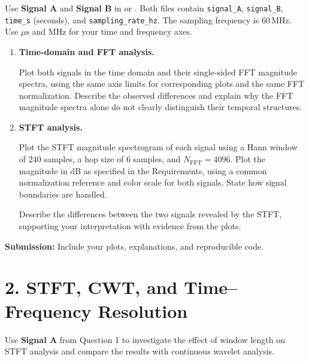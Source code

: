 \documentclass[11pt,a4paper]{article}
\begin{document}
Use \textbf{Signal A} and \textbf{Signal B} in  or
. Both files contain \texttt{signal\_A},
\texttt{signal\_B}, \texttt{time\_s} (seconds), and
\texttt{sampling\_rate\_hz}. The sampling frequency is $60\,\mathrm{MHz}$.
Use $\mu\mathrm{s}$ and $\mathrm{MHz}$ for your time and frequency axes.

\begin{enumerate}[label=(\alph*), leftmargin=1.5em]
    \item \textbf{Time-domain and FFT analysis.}

    Plot both signals in the time domain and their single-sided FFT magnitude
    spectra, using the same axis limits for corresponding plots and the same
    FFT normalization. Describe the observed
    differences and explain why the FFT magnitude spectra alone do not clearly
    distinguish their temporal structures.

    \item \textbf{STFT analysis.}

    Plot the STFT magnitude spectrogram of each signal using a Hann window
    of $240$ samples, a hop size of $6$ samples, and
    $N_{\mathrm{FFT}}=4096$. Plot the magnitude in dB as specified in the
    Requirements, using a common normalization reference and color scale
    for both signals. State how signal boundaries are handled.

    Describe the differences between the two signals revealed by the STFT,
    supporting your interpretation with evidence from the plots.
\end{enumerate}

\textbf{Submission:} Include your plots, explanations, and reproducible code.
\newpage
\section*{2. STFT, CWT, and Time--Frequency Resolution}

Use \textbf{Signal A} from Question 1 to investigate the effect of window
length on STFT analysis and compare the results with continuous wavelet analysis.
\end{document}
